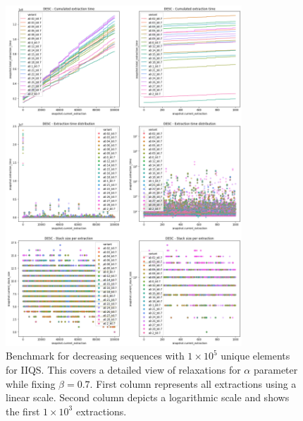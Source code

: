 \begin{figure}[!ht]
    \centering
    \includegraphics[width=0.79\textwidth]{./fragments/04_experimental_execution/images/04_alphabeta_detail_decreasing_left.png}
    \caption{Benchmark for decreasing sequences with $1\times10^5$ unique elements for IIQS. This covers a detailed view of relaxations for $\alpha$ parameter while fixing $\beta=0.7$. First column represents all extractions using a linear scale. Second column depicts a logarithmic scale and shows the first $1\times10^3$ extractions. }
    \label{FIG:05_ALPHABETA_BENCHMARK_DESC_LEFT}
\end{figure}

